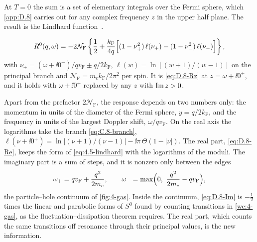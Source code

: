 At $T = 0$ the sum is a set of elementary integrals over the Fermi sphere, which \cref{app:D.8} carries out for any complex frequency $z$ in the upper half plane. The result is the Lindhard function~\cite{lindhard1954properties}.
\begin{keyresult}
\begin{equation}
  R^0(q,\omega) = -2\mathcal{N}_{\mathrm{F}}\left\{\frac12 + \frac{k_{\mathrm{F}}}{4q}\Bigl[(1 - \nu_+^2)\,\ell(\nu_+) - (1 - \nu_-^2)\,\ell(\nu_-)\Bigr]\right\} ,
  \label{eq:4.5-lindhard}
\end{equation}
with $\nu_\pm = (\omega + \ii0^+)/qv_{\mathrm{F}} \pm q/2k_{\mathrm{F}}$, $\ell(w) = \ln[(w + 1)/(w - 1)]$ on the principal branch and $\mathcal{N}_{\mathrm{F}} = m_ek_{\mathrm{F}}/2\pi^2$ per spin. It is \cref{eq:D.8-Rz} at $z = \omega + \ii0^+$, and it holds with $\omega + \ii0^+$ replaced by any $z$ with $\operatorname{Im} z > 0$.
\end{keyresult}
Apart from the prefactor $2\mathcal{N}_{\mathrm{F}}$, the response depends on two numbers only: the momentum in units of the diameter of the Fermi sphere, $y = q/2k_{\mathrm{F}}$, and the frequency in units of the largest Doppler shift, $\omega/qv_{\mathrm{F}}$. On the real axis the logarithms take the branch \cref{eq:C.8-branch}, $\ell(\nu + \ii0^+) = \ln|(\nu + 1)/(\nu - 1)| - \ii\pi\,\Theta(1 - |\nu|)$. The real part, \cref{eq:D.8-Re}, keeps the form of \cref{eq:4.5-lindhard} with the logarithms of the moduli. The imaginary part is a sum of steps, and it is nonzero only between the edges
\begin{equation*}
  \omega_+ = qv_{\mathrm{F}} + \frac{q^2}{2m_e}, \qquad \omega_- = \max\Bigl(0,\ \frac{q^2}{2m_e} - qv_{\mathrm{F}}\Bigr) ,
\end{equation*}
the particle--hole continuum of \cref{fig:4-gas}. Inside the continuum, \cref{eq:D.8-Im} is $-\tfrac12$ times the linear and parabolic forms of $S^0$ found by counting transitions in \cref{we:4-gas}, as the fluctuation--dissipation theorem requires. The real part, which counts the same transitions off resonance through their principal values, is the new information.

